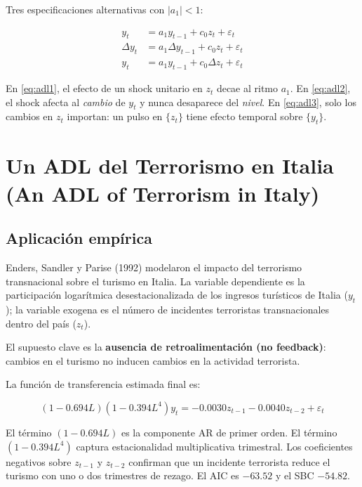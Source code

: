 \documentclass[12pt]{article}
\begin{document}
Tres especificaciones alternativas con $|a_1| < 1$:

\begin{align}
y_t &= a_1 y_{t-1} + c_0 z_t + \varepsilon_t \label{eq:adl1}\\
\Delta y_t &= a_1 \Delta y_{t-1} + c_0 z_t + \varepsilon_t \label{eq:adl2}\\
y_t &= a_1 y_{t-1} + c_0 \Delta z_t + \varepsilon_t \label{eq:adl3}
\end{align}

\begin{intuicionmat}
En \eqref{eq:adl1}, el efecto de un shock unitario en $z_t$ decae al ritmo $a_1$. En \eqref{eq:adl2}, el shock afecta al \textit{cambio} de $y_t$ y nunca desaparece del \textit{nivel}. En \eqref{eq:adl3}, solo los cambios en $z_t$ importan: un pulso en $\{z_t\}$ tiene efecto temporal sobre $\{y_t\}$.
\end{intuicionmat}

\section{Un ADL del Terrorismo en Italia (An ADL of Terrorism in Italy)}

\subsection{Aplicaci\'on emp\'irica}

Enders, Sandler y Parise (1992) modelaron el impacto del terrorismo transnacional sobre el turismo en Italia. La variable dependiente es la participaci\'on logar\'itmica desestacionalizada de los ingresos tur\'isticos de Italia ($y_t$); la variable exogena es el n\'umero de incidentes terroristas transnacionales dentro del pa\'is ($z_t$).

El supuesto clave es la \textbf{ausencia de retroalimentaci\'on (no feedback)}: cambios en el turismo no inducen cambios en la actividad terrorista.

La funci\'on de transferencia estimada final es:

\begin{equation}
(1 - 0.694L)(1 - 0.394L^4)y_t = -0.0030 z_{t-1} - 0.0040 z_{t-2} + \varepsilon_t
\end{equation}

\begin{intuicionmat}
El t\'ermino $(1 - 0.694L)$ es la componente AR de primer orden. El t\'ermino $(1 - 0.394L^4)$ captura estacionalidad multiplicativa trimestral. Los coeficientes negativos sobre $z_{t-1}$ y $z_{t-2}$ confirman que un incidente terrorista reduce el turismo con uno o dos trimestres de rezago. El AIC es $-63.52$ y el SBC $-54.82$.
\end{intuicionmat}
\end{document}
